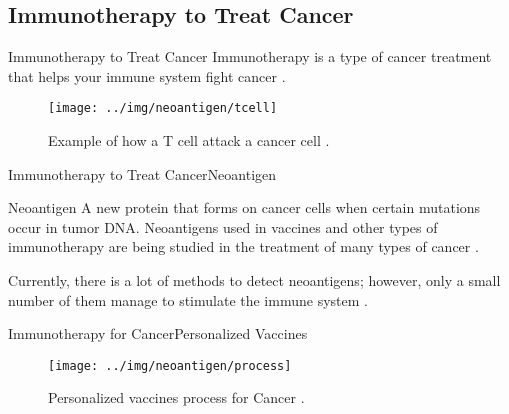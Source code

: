 \documentclass[10pt]{beamer}
\newcommand{\1}{
	\setbeamertemplate{background}{
		\texttt{[image: img/1]}
		\tikz[overlay] \fill[fill opacity=0.75,fill=white] (0,0) rectangle (-\paperwidth,\paperheight);
	}
}
\begin{document}
	\subsection{Immunotherapy to Treat Cancer}
	
	\begin{frame}{Immunotherapy to Treat Cancer}{}		
		Immunotherapy is a type of cancer treatment that helps your immune system fight cancer \cite{inmunoterapy2022}.
		
		\begin{figure}
			\texttt{[image: ../img/neoantigen/tcell]}
			\caption{Example of how a T cell attack a cancer cell \cite{nortshore2022}.}
		\end{figure}		
	\end{frame}
	
	\begin{frame}{Immunotherapy to Treat Cancer}{Neoantigen}		
		\begin{block}{Neoantigen}
			A new protein that forms on cancer cells when certain mutations occur in tumor DNA. Neoantigens used in vaccines and other types of immunotherapy are being studied in the treatment of many types of cancer \cite{NCIdictionary2022, borden2022cancer}.
		\end{block} 
		\begin{block}{}
			Currently, there is a lot of methods to detect neoantigens; however, only a small number of them manage to stimulate the immune system \cite{chen2021challenges, hao2021improvement}.
		\end{block}
	\end{frame}
	
	
	\begin{frame}{Immunotherapy for Cancer}{Personalized Vaccines}	
		\begin{figure}
			\texttt{[image: ../img/neoantigen/process]}
			\caption{Personalized vaccines process for Cancer \cite{peng2019neoantigen}.}
		\end{figure}		
	\end{frame}
	
\end{document}

